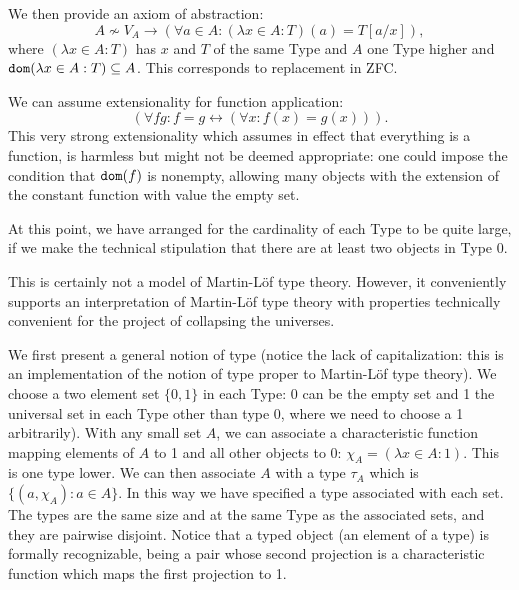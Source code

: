 \documentclass[12pt]{article}
\begin{document}
We then provide an axiom of abstraction:
$$A \not\sim V_A \rightarrow (\forall a \in A:(\lambda x \in A:T)(a) = T[a/x]),$$ where $(\lambda x\in A:T)$ has $x$ and $T$ of the same Type and $A$ one Type higher and ${\tt dom}(\lambda x \in A:T) \subseteq A$.  This corresponds to replacement in ZFC.

We can assume extensionality for function application:  $$(\forall fg:f=g \leftrightarrow (\forall x:f(x)=g(x))).$$ This very strong extensionality which assumes in effect that everything is a function, is harmless but might not be deemed appropriate:  one could impose the condition that ${\tt dom}(f)$ is nonempty, allowing many objects with the extension of the constant function with value the empty set.

At this point, we have arranged for the cardinality of each Type to be quite large, if we make the technical stipulation that there are at least two objects in Type 0.

This is certainly not a model of Martin-L\"of type theory.  However, it conveniently supports an interpretation of Martin-L\"of type theory with properties technically convenient for the project of collapsing the universes.

We first present a general notion of type (notice the lack of capitalization:  this is an implementation of the notion of type proper to Martin-L\"of type theory).  We choose a two element set $\{0,1\}$ in each Type:
0 can be the empty set and 1 the universal set in each Type other than type 0, where we need to choose a 1 arbitrarily).  With any small set $A$, we can associate a characteristic function mapping elements of $A$ to 1
and all other objects to 0:  $\chi_A = (\lambda x \in A:1)$.  This is one type lower.  We can then associate $A$ with a type $\tau_A$ which is $\{(a,\chi_A):a \in A\}$.  In this way we have specified a type associated with each set.
The types are the same size and at the same Type as the associated sets, and they are pairwise disjoint.  Notice that a typed object (an element of a type) is formally recognizable, being a pair whose second projection is a characteristic function which maps the first projection to 1.
\end{document}
